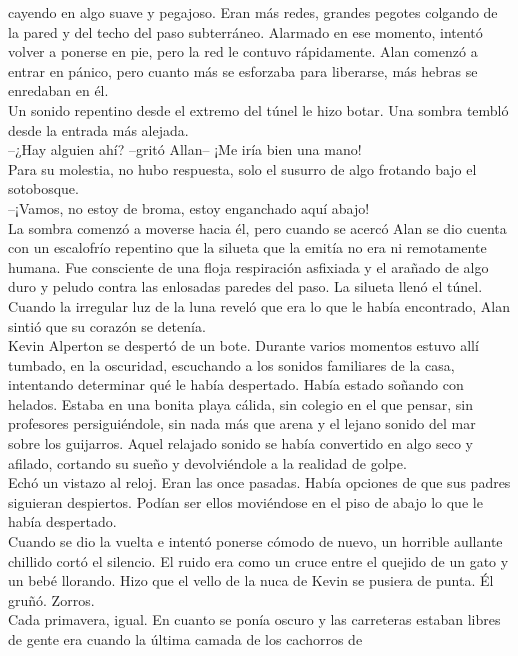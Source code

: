 {cayendo en algo suave y pegajoso. Eran más redes, grandes pegotes
colgando de la pared y del techo del paso subterráneo. Alarmado en ese
momento, intentó volver a ponerse en pie, pero la red le contuvo
rápidamente. Alan comenzó a entrar en pánico, pero cuanto más se
esforzaba para liberarse, más hebras se enredaban en él.\\
Un sonido repentino desde el extremo del túnel le hizo botar. Una sombra
tembló desde la entrada más alejada.\\
--¿Hay alguien ahí? --gritó Allan-- ¡Me iría bien una mano!\\
Para su molestia, no hubo respuesta, solo el susurro de algo frotando
bajo el sotobosque.\\
--¡Vamos, no estoy de broma, estoy enganchado aquí abajo!\\
La sombra comenzó a moverse hacia él, pero cuando se acercó Alan se dio
cuenta con un escalofrío repentino que la silueta que la emitía no era
ni remotamente humana. Fue consciente de una floja respiración asfixiada
y el arañado de algo duro y peludo contra las enlosadas paredes del
paso. La silueta llenó el túnel.\\
Cuando la irregular luz de la luna reveló que era lo que le había
encontrado, Alan sintió que su corazón se
detenía.\\[2\baselineskip]Kevin Alperton se despertó de un bote. Durante
varios momentos estuvo allí tumbado, en la oscuridad, escuchando a los
sonidos familiares de la casa, intentando determinar qué le había
despertado. Había estado soñando con helados. Estaba en una bonita playa
cálida, sin colegio en el que pensar, sin profesores persiguiéndole, sin
nada más que arena y el lejano sonido del mar sobre los guijarros. Aquel
relajado sonido se había convertido en algo seco y afilado, cortando su
sueño y devolviéndole a la realidad de golpe.\\
Echó un vistazo al reloj. Eran las once pasadas. Había opciones de que
sus padres siguieran despiertos. Podían ser ellos moviéndose en el piso
de abajo lo que le había despertado.\\
Cuando se dio la vuelta e intentó ponerse cómodo de nuevo, un horrible
aullante chillido cortó el silencio. El ruido era como un cruce entre el
quejido de un gato y un bebé llorando. Hizo que el vello de la nuca de
Kevin se pusiera de punta. Él gruñó. Zorros.\\
Cada primavera, igual. En cuanto se ponía oscuro y las carreteras
estaban libres de gente era cuando la última camada de los cachorros de
}
